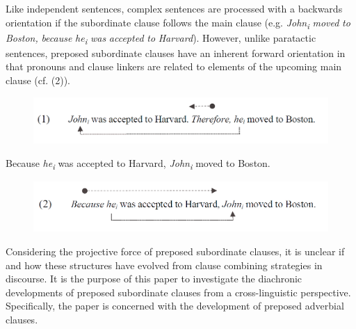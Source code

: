 \documentclass[output=paper]{langsci/langscibook}
\begin{document}


Like independent sentences, complex sentences are processed with a backwards orientation if the subordinate clause follows the main clause (e.g. \textit{John\textsubscript{i}} \textit{moved} \textit{to} \textit{Boston,} \textit{because} \textit{he\textsubscript{i}} \textit{was} \textit{accepted} \textit{to} \textit{Harvard}). However, unlike paratactic sentences, preposed subordinate clauses have an inherent forward orientation in that pronouns and clause linkers are related to elements of the upcoming main clause (cf. (2)).

 
\begin{figure}
\includegraphics[width=\textwidth]{figures/diessel-img1.png}
\end{figure}



\ea\label{ex:key:}
\ea%
    \label{ex:key:2} Because \textit{he\textsubscript{i}} was accepted to Harvard, \textit{John\textsubscript{i}} moved to Boston. 
  \z
  \z
  
\begin{figure}
\includegraphics[width=\textwidth]{figures/diessel-img2.png}
\end{figure}

Considering the projective force of preposed subordinate clauses, it is unclear if and how these structures have evolved from clause combining strategies in discourse. It is the purpose of this paper to investigate the diachronic developments of preposed subordinate clauses from a cross-linguistic perspective. Specifically, the paper is concerned with the development of preposed adverbial clauses. 
\end{document}
